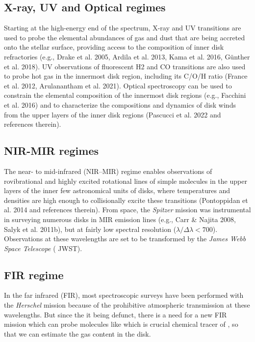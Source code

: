 \subsection{X-ray, UV and Optical regimes}
Starting at the high-energy end of the spectrum, X-ray and UV transitions are used to probe the elemental abundances of gas and dust that are being accreted onto the stellar surface, providing access to the composition of inner disk refractories (e.g., Drake et al. 2005, Ardila et al. 2013, Kama et al. 2016, Günther et al. 2018). UV observations of fluorescent H2 and CO transitions are also used to probe hot gas in the innermost disk region, including its C/O/H ratio (France et al. 2012, Arulanantham et al. 2021). Optical spectroscopy can be used to constrain the elemental composition of the innermost disk regions (e.g., Facchini et al. 2016) and to characterize the compositions and dynamics of disk winds from the upper layers of the inner disk regions (Pascucci et al. 2022 and references therein).

\subsection{NIR-MIR regimes}
The near- to mid-infrared (NIR–MIR) regime enables observations of rovibrational and highly excited rotational lines of simple molecules in the upper layers of the inner few astronomical units of disks, where temperatures and densities are high enough to collisionally excite these transitions (Pontoppidan et al. 2014 and references therein). From space, the \textit{Spitzer} mission was instrumental in surveying numerous disks in MIR emission lines (e.g., Carr \& Najita 2008, Salyk et al. 2011b), but at fairly low spectral resolution ($\lambda / \Delta \lambda < 700$). Observations at these wavelengths are set to be transformed by the \textit{James Webb Space Telescope} ( JWST).

\subsection{FIR regime}
In the far infrared (FIR), most spectroscopic surveys have been performed with the \textit{Herschel} mission because of the prohibitive atmospheric transmission at these wavelengths. But since the it being defunct, there is a need for a new FIR mission which can probe molecules like  which is crucial chemical tracer of , so that we can estimate the gas content in the disk.


